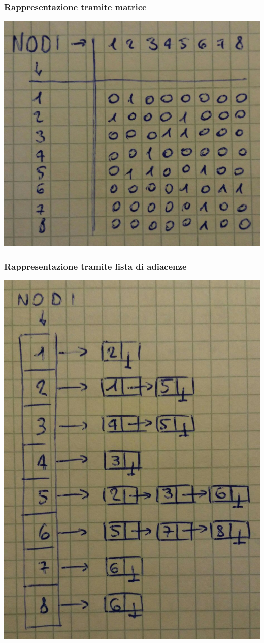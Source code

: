 \subsubsection{Rappresentazione tramite matrice}
\begin{center}
    \includegraphics[width=.4\textwidth]{rappresentazione-matrice.jpg} \hfill
\end{center}
\subsubsection{Rappresentazione tramite lista di adiacenze}
\begin{center}
    \includegraphics[width=.4\textwidth]{rappresentazione-lista-adiacenze.jpg} \hfill
\end{center}
